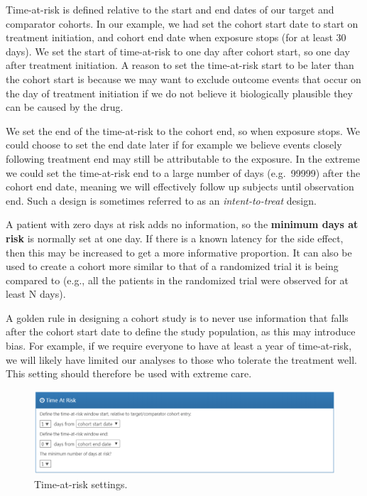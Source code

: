 \documentclass[11pt]{book}
\theoremstyle{definition}
\theoremstyle{definition}
\theoremstyle{definition}
\theoremstyle{remark}
\let\BeginKnitrBlock\begin \let\EndKnitrBlock\end
\begin{document}
Time-at-risk is defined relative to the start and end dates of our target and comparator cohorts. In our example, we had set the cohort start date to start on treatment initiation, and cohort end date when exposure stops (for at least 30 days). We set the start of time-at-risk to one day after cohort start, so one day after treatment initiation. A reason to set the time-at-risk start to be later than the cohort start is because we may want to exclude outcome events that occur on the day of treatment initiation if we do not believe it biologically plausible they can be caused by the drug.

We set the end of the time-at-risk to the cohort end, so when exposure stops. We could choose to set the end date later if for example we believe events closely following treatment end may still be attributable to the exposure. In the extreme we could set the time-at-risk end to a large number of days (e.g.~99999) after the cohort end date, meaning we will effectively follow up subjects until observation end. Such a design is sometimes referred to as an \emph{intent-to-treat} design.

A patient with zero days at risk adds no information, so the \textbf{minimum days at risk} is normally set at one day. If there is a known latency for the side effect, then this may be increased to get a more informative proportion. It can also be used to create a cohort more similar to that of a randomized trial it is being compared to (e.g., all the patients in the randomized trial were observed for at least N days).

\BeginKnitrBlock{rmdimportant}
A golden rule in designing a cohort study is to never use information that falls after the cohort start date to define the study population, as this may introduce bias. For example, if we require everyone to have at least a year of time-at-risk, we will likely have limited our analyses to those who tolerate the treatment well. This setting should therefore be used with extreme care.
\EndKnitrBlock{rmdimportant}

\begin{figure}

{\centering \includegraphics[width=1\linewidth]{images/PopulationLevelEstimation/timeAtRisk} 

}

\caption{Time-at-risk settings.}\label{fig:timeAtRisk}
\end{figure}
\end{document}
